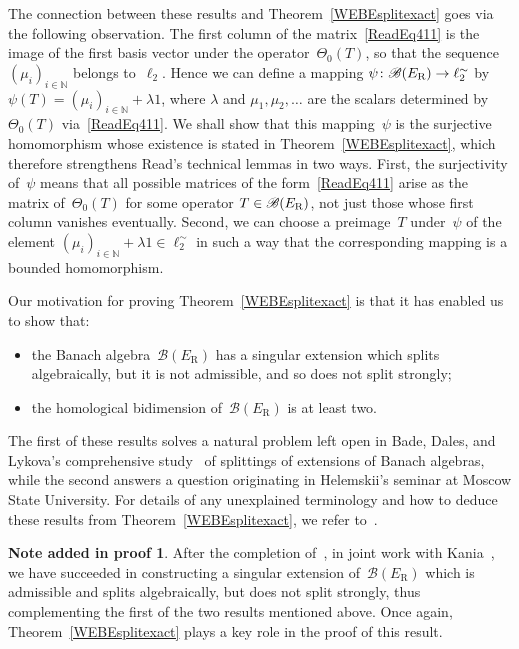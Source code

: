 \documentclass[12pt,reqno]{amsart}
\theoremstyle{definition}
\newtheorem*{noteadded}{Note added in proof}
\numberwithin{equation}{section}
\newcommand{\N}{\mathbb{N}}
\begin{document}
The connection between these results and Theorem~\ref{WEBEsplitexact}
goes via the following ob\-ser\-va\-tion. The first column of the
matrix~\eqref{ReadEq411} is the image of the first basis vector under
the operator~$\Theta_0(T)$, so that the sequence~$(\mu_i)_{i\in\N}$
belongs to~$\ell_2$. Hence we can define a mapping
$\psi\colon\mathscr{B}(E_{\normalfont{\text{R}}})\to\ell_2^{\sim}$ by
$\psi(T) = (\mu_i)_{i\in\N}+\lambda 1$, where $\lambda$ and
$\mu_1,\mu_2,\ldots$ are the scalars determined by~$\Theta_0(T)$
via~\eqref{ReadEq411}. We shall show that this mapping~$\psi$ is the
surjective homomorphism whose existence is stated in
Theorem~\ref{WEBEsplitexact}, which therefore strengthens Read's
technical lemmas in two ways. First, the surjectivity of~$\psi$ means
that all possible matrices of the form~\eqref{ReadEq411} arise as the
matrix of~$\Theta_0(T)$ for some operator
$T\in\mathscr{B}(E_{\normalfont{\text{R}}})$, not just those whose
first column vanishes eventually. Second, we can choose a
pre\-image~$T$ under~$\psi$ of the element $(\mu_i)_{i\in\N}+\lambda
1\in\ell_2^{\sim}$ in such a way that the corresponding mapping is a
bounded homomorphism.

Our motivation for proving Theorem~\ref{WEBEsplitexact} is that it
has enabled us to show that:
\begin{itemize}
\item the Banach algebra~$\mathscr{B}(E_{\text{R}})$ has a singular
  extension which splits algebraically, but it is not admissible, and
  so does not split strong\-ly;
\item the homological bidimension of~$\mathscr{B}(E_{\text{R}})$ is at
  least two.
\end{itemize}
The first of these results solves a natural problem left open in Bade,
Dales, and Lykova's comprehensive study~\cite{bdl} of splittings of
extensions of Banach algebras, while the second answers a question
originating in Helemskii's seminar at Moscow State University. For
details of any unexplained terminology and how to deduce these results
from Theorem~\ref{WEBEsplitexact}, we refer to~\cite{NJLRS}.

\begin{noteadded} After the completion of~\cite{NJLRS}, in
joint work with Kania~\cite{KLS}, we have succeeded in constructing a
singular extension of~$\mathscr{B}(E_{\text{R}})$ which is admissible
and splits algebraically, but does not split strong\-ly, thus
complementing the first of the two results mentioned above. Once
again, Theorem~\ref{WEBEsplitexact} plays a key role in the proof of
this result.
\end{noteadded}
\end{document}
